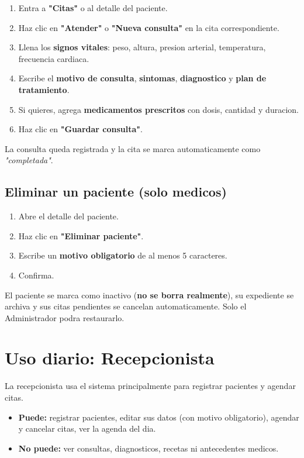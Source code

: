 \documentclass[11pt,a4paper]{article}
\begin{document}
\begin{enumerate}
    \item Entra a \textbf{"Citas"} o al detalle del paciente.
    \item Haz clic en \textbf{"Atender"} o \textbf{"Nueva consulta"} en la cita correspondiente.
    \item Llena los \textbf{signos vitales}: peso, altura, presion arterial, temperatura, frecuencia cardiaca.
    \item Escribe el \textbf{motivo de consulta}, \textbf{sintomas}, \textbf{diagnostico} y \textbf{plan de tratamiento}.
    \item Si quieres, agrega \textbf{medicamentos prescritos} con dosis, cantidad y duracion.
    \item Haz clic en \textbf{"Guardar consulta"}.
\end{enumerate}

La consulta queda registrada y la cita se marca automaticamente como \textit{"completada"}.
\subsection{Eliminar un paciente (solo medicos)}

\begin{enumerate}
    \item Abre el detalle del paciente.
    \item Haz clic en \textbf{"Eliminar paciente"}.
    \item Escribe un \textbf{motivo obligatorio} de al menos 5 caracteres.
    \item Confirma.
\end{enumerate}

\begin{cajaInfo}
    El paciente se marca como inactivo (\textbf{no se borra realmente}), su expediente se archiva y sus citas pendientes se cancelan automaticamente. Solo el Administrador podra restaurarlo.
\end{cajaInfo}

\section{Uso diario: Recepcionista}

La recepcionista usa el sistema principalmente para registrar pacientes y agendar citas.
\begin{itemize}
    \item \textbf{Puede:} registrar pacientes, editar sus datos (con motivo obligatorio), agendar y cancelar citas, ver la agenda del dia.
    \item \textbf{No puede:} ver consultas, diagnosticos, recetas ni antecedentes medicos.
\end{itemize}
\end{document}
